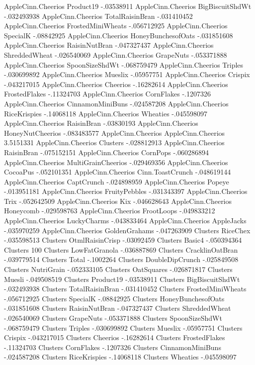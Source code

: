 AppleCinn.Cheerios	Product19	-.03538911
AppleCinn.Cheerios	BigBiscuitShdWt	-.032493938
AppleCinn.Cheerios	TotalRaisinBran	-.031410452
AppleCinn.Cheerios	FrostedMiniWheats	-.056712925
AppleCinn.Cheerios	SpecialK	-.08842925
AppleCinn.Cheerios	HoneyBunchesofOats	-.031851608
AppleCinn.Cheerios	RaisinNutBran	-.047327437
AppleCinn.Cheerios	ShreddedWheat	-.026540069
AppleCinn.Cheerios	GrapeNuts	-.053371888
AppleCinn.Cheerios	SpoonSizeShdWt	-.068759479
AppleCinn.Cheerios	Triples	-.030699892
AppleCinn.Cheerios	Mueslix	-.05957751
AppleCinn.Cheerios	Crispix	-.043217015
AppleCinn.Cheerios	Cheerios	-.16282614
AppleCinn.Cheerios	FrostedFlakes	-.11324703
AppleCinn.Cheerios	CornFlakes	-.1207326
AppleCinn.Cheerios	CinnamonMiniBuns	-.024587208
AppleCinn.Cheerios	RiceKrispies	-.14068118
AppleCinn.Cheerios	Wheaties	-.045598097
AppleCinn.Cheerios	RaisinBran	-.03830193
AppleCinn.Cheerios	HoneyNutCheerios	-.083483577
AppleCinn.Cheerios	AppleCinn.Cheerios	3.5151331
AppleCinn.Cheerios	Clusters	-.028812913
AppleCinn.Cheerios	RaisinBran	-.075152151
AppleCinn.Cheerios	CornPops	-.060286894
AppleCinn.Cheerios	MultiGrainCheerios	-.029469356
AppleCinn.Cheerios	CocoaPus	-.052101351
AppleCinn.Cheerios	Cinn.ToastCrunch	-.048619144
AppleCinn.Cheerios	CaptCrunch	-.024898959
AppleCinn.Cheerios	Popeye	-.013951181
AppleCinn.Cheerios	FruityPebbles	-.031343397
AppleCinn.Cheerios	Trix	-.052642509
AppleCinn.Cheerios	Kix	-.046628643
AppleCinn.Cheerios	Honeycomb	-.029598763
AppleCinn.Cheerios	FrootLoops	-.049833212
AppleCinn.Cheerios	LuckyCharms	-.043833464
AppleCinn.Cheerios	AppleJacks	-.035970259
AppleCinn.Cheerios	GoldenGrahams	-.047263909
Clusters	RiceChex	-.035598513
Clusters	OtmlRaisinCrisp	-.03092459
Clusters	Basic4	-.050394364
Clusters	100%
Clusters	LowFatGranola	-.036887869
Clusters	CracklinOatBran	-.039779514
Clusters	Total	-.1002264
Clusters	DoubleDipCrunch	-.025849508
Clusters	NutriGrain	-.052333105
Clusters	OatSquares	-.026871817
Clusters	Muesli	-.049508519
Clusters	Product19	-.03538911
Clusters	BigBiscuitShdWt	-.032493938
Clusters	TotalRaisinBran	-.031410452
Clusters	FrostedMiniWheats	-.056712925
Clusters	SpecialK	-.08842925
Clusters	HoneyBunchesofOats	-.031851608
Clusters	RaisinNutBran	-.047327437
Clusters	ShreddedWheat	-.026540069
Clusters	GrapeNuts	-.053371888
Clusters	SpoonSizeShdWt	-.068759479
Clusters	Triples	-.030699892
Clusters	Mueslix	-.05957751
Clusters	Crispix	-.043217015
Clusters	Cheerios	-.16282614
Clusters	FrostedFlakes	-.11324703
Clusters	CornFlakes	-.1207326
Clusters	CinnamonMiniBuns	-.024587208
Clusters	RiceKrispies	-.14068118
Clusters	Wheaties	-.045598097
